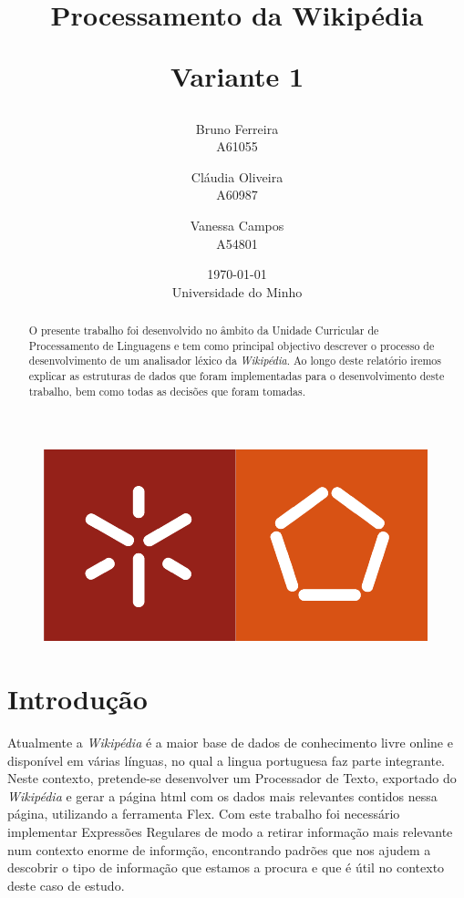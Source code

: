\documentclass[11pt, a4paper, oneside]{article}
\begin{document}
\title{Processamento da Wikipédia\\
\begin{normalsize}
Variante 1
\end{normalsize}}
\date{\today\\Universidade do Minho}
\author{
  Bruno Ferreira\\
  {\small A61055}\\
  \and
  Cláudia Oliveira\\
  {\small A60987}\\
  \and
  Vanessa Campos\\
  {\small A54801}\\
}

\maketitle

\begin{figure}[h]
\begin{center}
\includegraphics[width=0.4\linewidth]{logo}
\end{center}
\end{figure}


\begin{abstract}

  O presente trabalho foi desenvolvido no âmbito da Unidade Curricular de Processamento de Linguagens e tem como principal objectivo descrever o processo de desenvolvimento de um analisador léxico da \textit{Wikipédia}. Ao longo deste relatório iremos explicar as estruturas de dados que foram implementadas para o desenvolvimento deste trabalho, bem como todas as decisões que foram tomadas.

\end{abstract}
\newpage

\tableofcontents
\listoffigures 

\newpage
\section{Introdução}

Atualmente a \textit{Wikipédia} é a maior base de dados de conhecimento livre online e disponível em várias línguas, no qual a lingua portuguesa faz parte integrante. Neste contexto, pretende-se desenvolver um Processador de Texto, exportado do \textit{Wikipédia} e gerar a página html com os dados mais relevantes contidos nessa página, utilizando a ferramenta Flex. 
Com este trabalho foi necessário implementar Expressões Regulares de modo a retirar informação mais relevante num contexto enorme de informção, encontrando padrões que nos ajudem a descobrir o tipo de informação que estamos a procura e que é útil no contexto deste caso de estudo.
\end{document}
